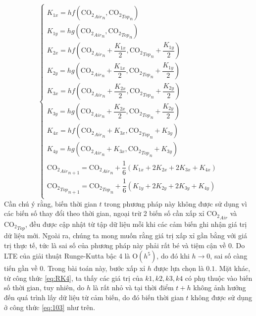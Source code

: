 \documentclass[a4paper]{article}
\begin{document}
\begin{equation}\label{eq:103}
\begin{cases}
    K_{1x} = hf({\mathrm{CO_{2}}_{Air}}_n, {\mathrm{CO_{2}}_{Top}}_n) \\
    K_{1y} = hg({\mathrm{CO_{2}}_{Air}}_n, {\mathrm{CO_{2}}_{Top}}_n) \\
    K_{2x} = hf \left ({\mathrm{CO_{2}}_{Air}}_n + \dfrac{K_{1x}}{2}, {\mathrm{CO_{2}}_{Top}}_n + \dfrac{K_{1y}}{2} \right ) \\
    K_{2y} = hg \left ({\mathrm{CO_{2}}_{Air}}_n + \dfrac{K_{1x}}{2}, {\mathrm{CO_{2}}_{Top}}_n + \dfrac{K_{1y}}{2} \right ) \\
    K_{3x} = hf \left ({\mathrm{CO_{2}}_{Air}}_n + \dfrac{K_{2x}}{2}, {\mathrm{CO_{2}}_{Top}}_n + \dfrac{K_{2y}}{2} \right ) \\
    K_{3y} = hg \left ({\mathrm{CO_{2}}_{Air}}_n + \dfrac{K_{2x}}{2}, {\mathrm{CO_{2}}_{Top}}_n + \dfrac{K_{2y}}{2} \right ) \\
    K_{4x} = hf({\mathrm{CO_{2}}_{Air}}_n + K_{3x}, {\mathrm{CO_{2}}_{Top}}_n + K_{3y}) \\
    K_{4y} = hg({\mathrm{CO_{2}}_{Air}}_n + K_{3x}, {\mathrm{CO_{2}}_{Top}}_n + K_{3y}) \\
    {\mathrm{CO_{2}}_{Air}}_{n+1} = {\mathrm{CO_{2}}_{Air}}_n + \dfrac{1}{6}(K_{1x} + 2K_{2x} + 2K_{3x} + K_{4x}) \\ 
    {\mathrm{CO_{2}}_{Top}}_{n+1} = {\mathrm{CO_{2}}_{Top}}_n + \dfrac{1}{6}(K_{1y} + 2K_{2y} + 2K_{3y} + K_{4y}) \\
\end{cases}
\end{equation}
Cần chú ý rằng, biến thời gian $t$ trong phương pháp này không được sử dụng vì các biến số thay đổi theo thời gian, ngoại trừ 2 biến số cần xấp xỉ $\mathrm{CO_{2}}_{Air}$ và $\mathrm{CO_{2}}_{Top}$, đều được cập nhật từ tập dữ liệu mỗi khi các cảm biến ghi nhận giá trị dữ liệu mới. Ngoài ra, chúng ta mong muốn rằng giá trị xấp xỉ gần bằng với giá trị thực tế, tức là sai số của phương pháp này phải rất bé và tiệm cận về 0. Do LTE của giải thuật Runge-Kutta bậc 4 là $\mathrm{O}(h^5)$, do đó khi $h \rightarrow 0$, sai số càng tiến gần về 0. Trong bài toán này, bước xấp xỉ $h$ được lựa chọn là $0.1$. Mặt khác, từ công thức \eqref{eq:RK4}, ta thấy các giá trị của $k1, k2, k3, k4$ có phụ thuộc vào biến số thời gian, tuy nhiên, do $h$ là rất nhỏ và tại thời điểm $t+h$ không ảnh hưởng đến quá trình lấy dữ liệu từ cảm biến, do đó biến thời gian $t$ không được sử dụng ở công thức \eqref{eq:103} như trên. \par
\end{document}
